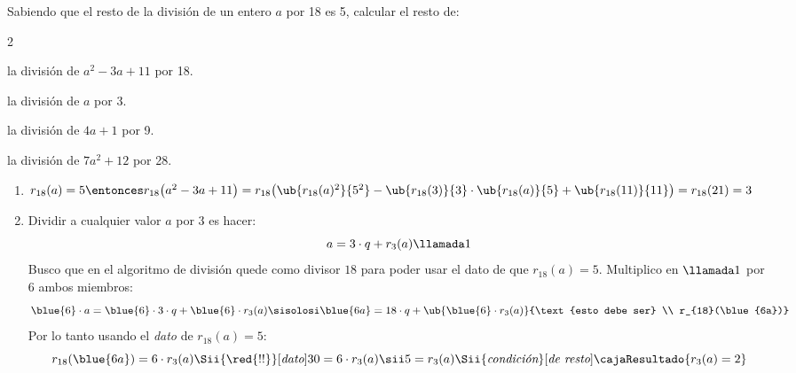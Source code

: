\begin{enunciado}{\ejercicio}
  Sabiendo que el resto de la división de un entero
  $a$ por 18 es 5, calcular el resto de:
  \begin{enumerate}[label=\alph*)]
    \begin{multicols}{2}
      \item la división de $a^2 -3a +11$ por 18.
      \item la división de $a$ por 3.
      \item la división de $4a+1$ por 9.
      \item la división de $7a^2 + 12$ por 28.
    \end{multicols}
  \end{enumerate}
\end{enunciado}

\begin{enumerate}[label=\purple{\alph*)}]
  \item $r_{18}(a) = 5
          \entonces
          r_{18}
          \big(
          a^2 -3a +11
          \big) =
          r_{18}\big(
          \ub{r_{18}(a)^2}{5^2} - \ub{r_{18}(3)}{3} \cdot \ub{r_{18}(a)}{5} + \ub{r_{18}(11)}{11}
          \big) =
          r_{18}(21) = 3 $

  \item Dividir a cualquier valor $a$ por 3 es hacer:
        $$
          a = 3 \cdot q + r_3(a)\llamada1
        $$
        Busco que en el algoritmo de división quede como divisor $18$ para poder usar el dato de que $r_{18}(a) = 5$.
        Multiplico en $\llamada1$ por 6 ambos miembros:
        $$
          \blue{6} \cdot a = \blue{6} \cdot 3 \cdot q + \blue{6} \cdot r_3(a)
          \sisolosi
          \blue{6a} = 18 \cdot q + \ub{\blue{6} \cdot r_3(a)}{\text{esto debe ser} \\ r_{18}(\blue{6a})}
        $$
        Por lo tanto usando el \textit{dato} de $r_{18}(a) = 5$:
        $$
          r_{18}(\blue{6a}) = 6 \cdot r_3(a)
          \Sii{\red{!!}}[\textit{dato}]
          30 = 6 \cdot r_3(a)
          \sii
          5 = r_3(a)
          \Sii{\textit{condición}}[\textit{de resto}]
          \cajaResultado{
            r_3(a) = 2
          }
        $$


\end{enumerate}

